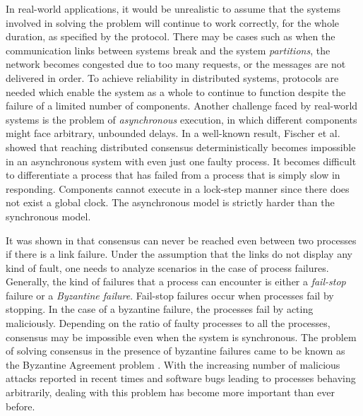 In real-world applications, it would be unrealistic to assume that the systems involved in solving the problem will continue to work correctly, for the whole duration, as specified by the protocol. There may be cases such as when the communication links between systems break and the system \textit{partitions}, the network becomes congested due to too many requests, or the messages are not delivered in order. To achieve reliability in distributed systems, protocols are needed which enable the system as a whole to continue to function despite the failure of a limited number of components. Another challenge faced by real-world systems is the problem of \textit{asynchronous} execution, in which different components might face arbitrary, unbounded delays. In a well-known result, Fischer et al. \cite{FischerLP83} showed that reaching distributed consensus deterministically becomes impossible in an asynchronous system with even just one faulty process. It becomes difficult to differentiate a process that has failed from a process that is simply slow in responding. Components cannot execute in a lock-step manner since there does not exist a global clock. The asynchronous model is strictly harder than the synchronous model. 

It was shown in \cite{LamportSP82} that consensus can never be reached even between two processes if there is a link failure. Under the assumption that the links do not display any kind of fault, one needs to analyze scenarios in the case of process failures. Generally, the kind of failures that a process can encounter is either a \textit{fail-stop} failure or a \textit{Byzantine failure}. Fail-stop failures occur when processes fail by stopping. In the case of a byzantine failure, the processes fail by acting maliciously. Depending on the ratio of faulty processes to all the processes, consensus may be impossible even when the system is synchronous. The problem of solving consensus in the presence of byzantine failures came to be known as the Byzantine Agreement problem \cite{LamportSP82}. With the increasing number of malicious attacks reported in recent times and software bugs leading to processes behaving arbitrarily, dealing with this problem has become more important than ever before.

